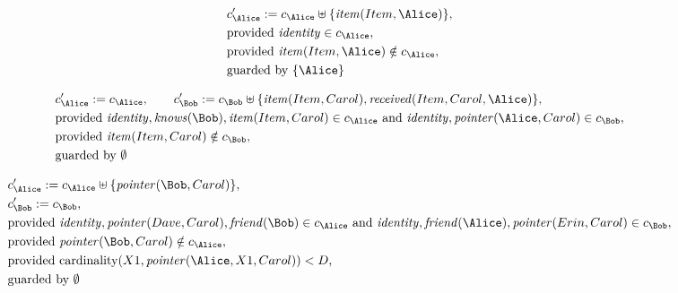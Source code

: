 \begin{align*}
&
c'_
{
\Alice
}
 := 
c_
{
\Alice
}
 \uplus 
\{
\mathit{
item
}
(
Item
,
\Alice
)
\}
,\\
&
\text{provided } 
\mathit{
identity
}
 \in c_
{
\Alice
}
,\\
&
\text{provided } 
\mathit{
item
}
(
Item
,
\Alice
)
 \notin c_
{
\Alice
}
,\\
&
\text{guarded by } \{
\Alice
\}
\end{align*}

\begin{align*}
&
c'_
{
\Alice
}
 := 
c_
{
\Alice
}
, \qquad 
c'_
{
\Bob
}
 := 
c_
{
\Bob
}
 \uplus 
\{
\mathit{
item
}
(
Item
,
Carol
)
,
\mathit{
received
}
(
Item
,
Carol
,
\Alice
)
\}
,\\
&
\text{provided } 
\mathit{
identity
}
,
\mathit{
knows
}
(
\Bob
)
,
\mathit{
item
}
(
Item
,
Carol
)
 \in c_
{
\Alice
}
 \text{ and } 
\mathit{
identity
}
,
\mathit{
pointer
}
(
\Alice
,
Carol
)
 \in c_
{
\Bob
}
,\\
&
\text{provided } 
\mathit{
item
}
(
Item
,
Carol
)
 \notin c_
{
\Bob
}
,\\
&
\text{guarded by } \emptyset
\end{align*}

\begin{align*}
&
c'_
{
\Alice
}
 := 
c_
{
\Alice
}
 \uplus 
\{
\mathit{
pointer
}
(
\Bob
,
Carol
)
\}
,\\
&
c'_
{
\Bob
}
 := 
c_
{
\Bob
}
,\\
&
\text{provided } 
\mathit{
identity
}
,
\mathit{
pointer
}
(
Dave
,
Carol
)
,
\mathit{
friend
}
(
\Bob
)
 \in c_
{
\Alice
}
 \text{ and } 
\mathit{
identity
}
,
\mathit{
friend
}
(
\Alice
)
,
\mathit{
pointer
}
(
Erin
,
Carol
)
 \in c_
{
\Bob
}
,\\
&
\text{provided } 
\mathit{
pointer
}
(
\Bob
,
Carol
)
 \notin c_
{
\Alice
}
,\\
&
\text{provided } 
\mathrm{cardinality}(
X1
,
\mathit{
pointer
}
(
\Alice
,
X1
,
Carol
)
)
<
D
,\\
&
\text{guarded by } \emptyset
\end{align*}
